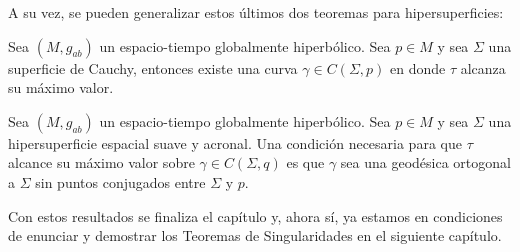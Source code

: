 A su vez, se pueden generalizar estos últimos dos teoremas para hipersuperficies:

\begin{theorem}\label{teo existencia curva maxima long}
Sea $(M,g_{ab})$ un espacio-tiempo globalmente hiperbólico. Sea $p\in M$ y sea $\Sigma$ una superficie de Cauchy, entonces existe una curva $\gamma\in C(\Sigma,p)$ en donde $\tau$ alcanza su máximo valor.
\end{theorem}


\begin{theorem}
Sea $(M,g_{ab})$ un espacio-tiempo globalmente hiperbólico. Sea $p\in M$ y sea $\Sigma$ una hipersuperficie espacial suave y acronal. Una condición necesaria para que $\tau$ alcance su máximo valor sobre $\gamma\in C(\Sigma,q)$ es que $\gamma$ sea una geodésica ortogonal a $\Sigma$ sin puntos conjugados entre $\Sigma$ y $p$.
\end{theorem}




Con estos resultados se finaliza el capítulo y, ahora sí, ya estamos en condiciones de enunciar y demostrar los Teoremas de Singularidades en el siguiente capítulo.

